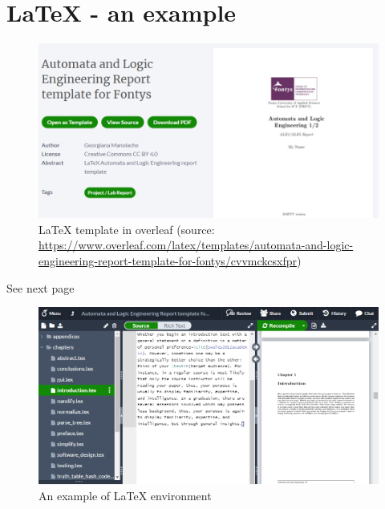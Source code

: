 \chapter{LaTeX - an example}\label{appendices:latex}


\begin{figure}[h]
    \centering
    \includegraphics[width =\textwidth]{appendices/latex/latex_images/latex_example1.PNG}
    \caption{LaTeX template in \Gls{overleaf} (source: \url{https://www.overleaf.com/latex/templates/automata-and-logic-engineering-report-template-for-fontys/cvvmckcsxfpr})}
    \label{fig:latex_main}
\end{figure}
\noindent
\begin{minipage}{0.5\textwidth}
\begin{flushleft}
\end{flushleft}
\end{minipage}
\hfill
\begin{minipage}{0.5\textwidth}
\begin{flushright}
   See next page
\end{flushright}
\end{minipage}

\begin{figure}[h]
    \centering
    \includegraphics[width = \textwidth]{appendices/latex/latex_images/latex_example2.PNG}
    \caption{An example of LaTeX environment}
    \label{fig:latex_example}
\end{figure}

